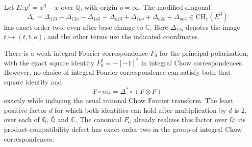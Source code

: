 \begin{proposition}
Let $E:y^2=x^3-x$ over $\mathbb Q$, with origin $o=\infty$.
The modified diagonal
\[
 \Delta_e=\Delta_{123}-\Delta_{12o}-\Delta_{1o3}-\Delta_{o23}
                +\Delta_{1oo}+\Delta_{o2o}+\Delta_{oo3}
       \in\mathrm{CH}_1(E^3)
\]
has exact order two, even after base change to $\mathbb C$.
Here $\Delta_{12o}$ denotes the image $t\mapsto(t,t,o)$,
and the other terms use the indicated coordinates.

There is a weak integral Fourier correspondence $F_0$
for the principal polarization, with the exact square
identity $F_0^2=-[-1]^*$ in integral Chow correspondences.
However, no choice of integral Fourier correspondence can
satisfy both that square identity and
\[
 F\circ m_* = \Delta^*\circ(F\otimes F)
\]
exactly while inducing the usual rational Chow Fourier
transform.  The least positive factor $d$ for which
both identities can hold after multiplication by $d$
is $2$, over each of $\mathbb Q$, $\overline{\mathbb Q}$
and $\mathbb C$.  The canonical $F_0$ already realizes
this factor over $\mathbb Q$; its product-compatibility
defect has exact order two in the group of integral
Chow correspondences.
\end{proposition}
